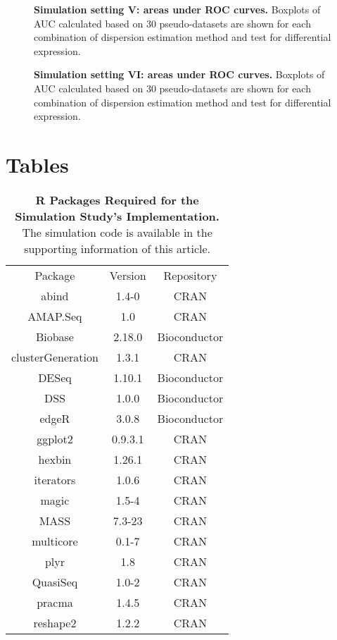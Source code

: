 \documentclass[10pt]{article}
\begin{document}
\begin{figure}[!ht] %
   \centering
   \caption{{\bf Simulation setting V: areas under ROC curves.} Boxplots of AUC calculated based on 30 pseudo-datasets are shown for each combination of dispersion estimation method and test for differential expression.} %
   \label{fig:auc5}
\end{figure}

\begin{figure}[!ht] %
   \centering
   \caption{{\bf Simulation setting VI: areas under ROC curves.} Boxplots of AUC calculated based on 30 pseudo-datasets are shown for each combination of dispersion estimation method and test for differential expression.} %
   \label{fig:auc6}
\end{figure}


\clearpage

\section*{Tables}

\begin{table}[!ht] %
   \centering
   \caption{{\bf R Packages Required for the Simulation Study's Implementation.} The simulation code is available in the supporting information of this article.} %
\begin{tabular}{|c|c|c|}
Package & Version & Repository \\
  abind & 1.4-0 &CRAN\\
  AMAP.Seq & 1.0 &CRAN\\
  Biobase & 2.18.0 &Bioconductor\\
  clusterGeneration & 1.3.1 &CRAN\\
  DESeq & 1.10.1 &Bioconductor\\
  DSS & 1.0.0 &Bioconductor\\
  edgeR & 3.0.8 &Bioconductor\\
  ggplot2 & 0.9.3.1 &CRAN\\
  hexbin & 1.26.1 &CRAN\\
  iterators & 1.0.6 &CRAN\\
  magic & 1.5-4 &CRAN\\
  MASS & 7.3-23 &CRAN\\
  multicore & 0.1-7 &CRAN\\
  plyr & 1.8 &CRAN\\
  QuasiSeq & 1.0-2 &CRAN\\
  pracma & 1.4.5 &CRAN\\
  reshape2 & 1.2.2 &CRAN\\
\end{tabular}
\label{tab:software}
\end{table}
\end{document}
